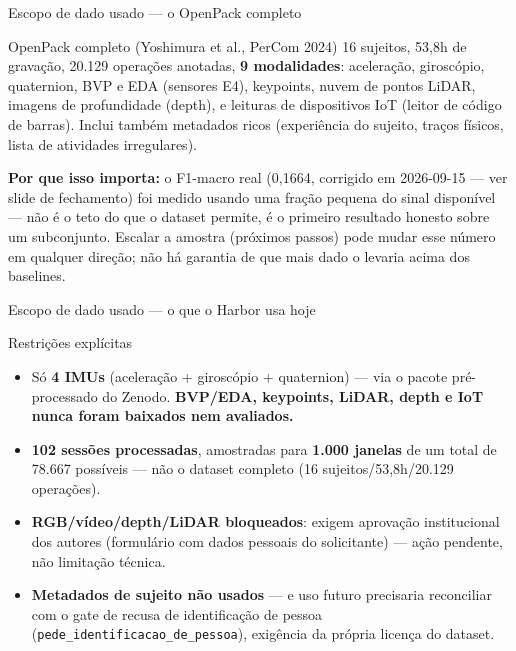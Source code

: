\documentclass{beamer}
\newenvironment{numerobloco}[1]{\begin{block}{#1}}{\end{block}}
\newenvironment{decisaobloco}[1]{\begin{alertblock}{#1}}{\end{alertblock}}
\begin{document}
\begin{frame}{Escopo de dado usado — o OpenPack completo}
  \small
  \begin{numerobloco}{OpenPack completo (Yoshimura et al., PerCom 2024)}
    16 sujeitos, 53,8h de gravação, 20.129 operações anotadas, \textbf{9 modalidades}:
    aceleração, giroscópio, quaternion, BVP e EDA (sensores E4), keypoints, nuvem de pontos
    LiDAR, imagens de profundidade (depth), e leituras de dispositivos IoT (leitor de código
    de barras). Inclui também metadados ricos (experiência do sujeito, traços físicos, lista
    de atividades irregulares).
  \end{numerobloco}

  \pause
  \textbf{Por que isso importa:} o F1-macro real (0,1664, corrigido em 2026-09-15 — ver slide
  de fechamento) foi medido usando uma fração pequena do sinal disponível — não é o teto do que
  o dataset permite, é o primeiro resultado honesto sobre um subconjunto. Escalar a amostra
  (próximos passos) pode mudar esse número em qualquer direção; não há garantia de que mais
  dado o levaria acima dos baselines.
\end{frame}

\begin{frame}{Escopo de dado usado — o que o Harbor usa hoje}
  \small
  \begin{decisaobloco}{Restrições explícitas}
    \begin{itemize}
      \item Só \textbf{4 IMUs} (aceleração + giroscópio + quaternion) — via o pacote
        pré-processado do Zenodo. \textbf{BVP/EDA, keypoints, LiDAR, depth e IoT nunca foram
        baixados nem avaliados.}
      \item \textbf{102 sessões processadas}, amostradas para \textbf{1.000 janelas} de um
        total de 78.667 possíveis — não o dataset completo (16 sujeitos/53,8h/20.129
        operações).
      \item \textbf{RGB/vídeo/depth/LiDAR bloqueados}: exigem aprovação institucional dos
        autores (formulário com dados pessoais do solicitante) — ação pendente, não
        limitação técnica.
      \item \textbf{Metadados de sujeito não usados} — e uso futuro precisaria reconciliar com
        o gate de recusa de identificação de pessoa (\texttt{pede\_identificacao\_de\_pessoa}),
        exigência da própria licença do dataset.
    \end{itemize}
  \end{decisaobloco}
\end{frame}
\end{document}
